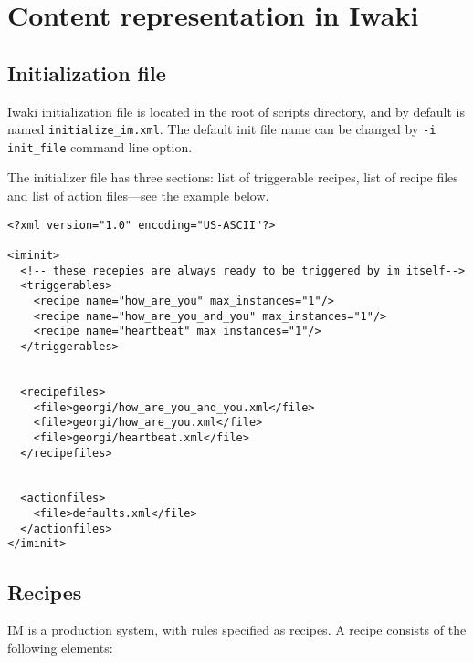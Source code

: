 \chapter{Content representation in Iwaki}
\label{Chapter3}

\section{Initialization file}

Iwaki initialization file is located in the root of scripts directory, and by default is named \texttt{initialize\_im.xml}. The default init file name can be changed by \texttt{-i init\_file} command line option.

The initializer file has three sections: list of triggerable recipes, list of recipe files and list of action files---see the example below.

\lstset{language=XML}
\begin{lstlisting}
<?xml version="1.0" encoding="US-ASCII"?>
 
<iminit>
  <!-- these recepies are always ready to be triggered by im itself-->
  <triggerables>
    <recipe name="how_are_you" max_instances="1"/>
    <recipe name="how_are_you_and_you" max_instances="1"/>
    <recipe name="heartbeat" max_instances="1"/>
  </triggerables>

 
  <recipefiles>
    <file>georgi/how_are_you_and_you.xml</file>
    <file>georgi/how_are_you.xml</file>
    <file>georgi/heartbeat.xml</file>
  </recipefiles>


  <actionfiles>
    <file>defaults.xml</file>
  </actionfiles>
</iminit>
\end{lstlisting}

\section{Recipes}

IM is a production system, with rules specified as recipes. A recipe consists of the following elements:

